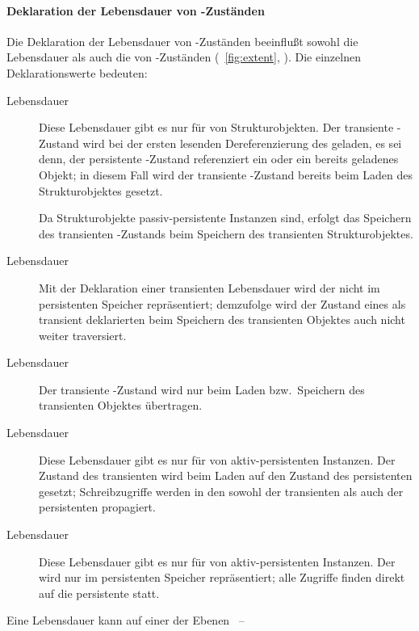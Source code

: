 \paragraph{Deklaration der Lebensdauer von
\protect\Slt\/-Zust\"{a}nden}
%
Die Deklaration der Lebensdauer von \Slt\/-Zust\"{a}nden beeinflu\ss{}t
sowohl die Lebensdauer als auch die \representationform{} von
\Slt\/-Zust\"{a}nden 
\ifbericht%
\cite[]{bib:ki94a}%
\else%
(\figurename~\ref{fig:extent},
\citepage{\pageref{fig:extent}})\fi. Die einzelnen Deklarationswerte
bedeuten:
\begin{description}
%
\item[Lebensdauer ]
Diese Lebensdauer gibt es nur f\"{u}r
\Slt[s]\/ von Strukturobjekten. Der transiente \Slt\/-Zustand wird bei
der ersten lesenden Dereferenzierung des \Slt[s]\/ geladen, es sei
denn, der persistente \Slt\/-Zustand referenziert ein \immval\/ oder
ein bereits geladenes  Objekt; in diesem Fall wird der transiente
\Slt\/-Zustand bereits beim Laden des Strukturobjektes gesetzt.
%
\par{}Da Strukturobjekte passiv-persistente Instanzen sind, erfolgt
das Speichern des transienten \Slt\/-Zustands beim Speichern des
transienten Strukturobjektes.
%
\item[Lebensdauer ]
Mit der Deklaration einer transienten Lebensdauer
wird der \Slt\/ nicht im persistenten Speicher repr\"{a}sentiert;
demzufolge wird der Zustand eines als transient deklarierten
\Slt[s]\/ beim Speichern des transienten Objektes auch nicht
weiter traversiert.
%
\item[Lebensdauer ]
Der transiente \Slt\/-Zustand wird nur beim Laden bzw.\ Speichern des
transienten Objektes \"{u}bertragen.
%
\item[Lebensdauer ]
Diese Lebensdauer gibt es nur f\"{u}r \Slt[s]\/ von aktiv-persistenten
Instanzen.  Der Zustand des transienten \Slt[s]\/ wird beim Laden auf
den Zustand des persistenten \Slt[s]\/ gesetzt; Schreibzugriffe werden
in den \Slt\/ sowohl der transienten als auch der persistenten
\representation{} propagiert.
%
\item[Lebensdauer ]
Diese Lebensdauer gibt es nur f\"{u}r \Slt[s]\/ von aktiv-persistenten
Instanzen.  Der \Slt\/ wird nur im persistenten Speicher
repr\"{a}sentiert; alle Zugriffe finden direkt auf die persistente
\representation{} statt. 
%
\end{description}
Eine Lebensdauer kann auf einer der Ebenen \rglq\Slt\/\rgrq\ --
